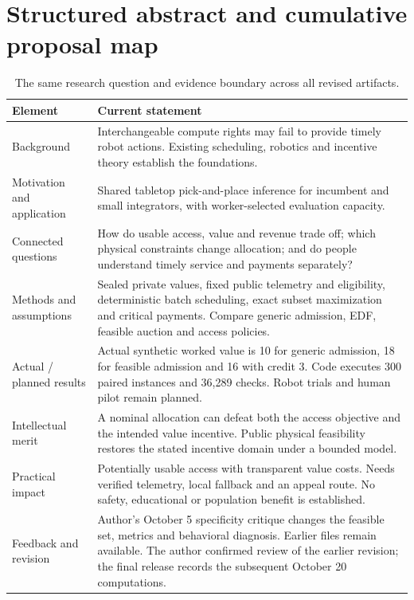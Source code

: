 \section{Structured abstract and cumulative proposal map}
\begin{table}[h]\small
\begin{tabularx}{\textwidth}{p{}Y}\toprule
Element & Current statement\\\midrule
Background & Interchangeable compute rights may fail to provide timely robot actions. Existing scheduling, robotics and incentive theory establish the foundations.\\
Motivation and application & Shared tabletop pick-and-place inference for incumbent and small integrators, with worker-selected evaluation capacity.\\
Connected questions & How do usable access, value and revenue trade off; which physical constraints change allocation; and do people understand timely service and payments separately?\\
Methods and assumptions & Sealed private values, fixed public telemetry and eligibility, deterministic batch scheduling, exact subset maximization and critical payments. Compare generic admission, EDF, feasible auction and access policies.\\
Actual / planned results & Actual synthetic worked value is 10 for generic admission, 18 for feasible admission and 16 with credit 3. Code executes 300 paired instances and 36,289 checks. Robot trials and human pilot remain planned.\\
Intellectual merit & A nominal allocation can defeat both the access objective and the intended value incentive. Public physical feasibility restores the stated incentive domain under a bounded model.\\
Practical impact & Potentially usable access with transparent value costs. Needs verified telemetry, local fallback and an appeal route. No safety, educational or population benefit is established.\\
Feedback and revision & Author's October 5 specificity critique changes the feasible set, metrics and behavioral diagnosis. Earlier files remain available. The author confirmed review of the earlier revision; the final release records the subsequent October 20 computations.\\\bottomrule
\end{tabularx}
\caption{The same research question and evidence boundary across all revised artifacts.}
\end{table}
\clearpage\twocolumn
